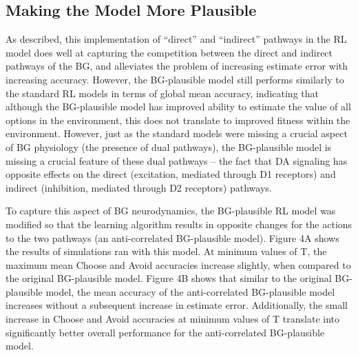 \documentclass[10pt,letterpaper]{article}
\begin{document}
\subsection{Making the Model More Plausible}

As described, this implementation of “direct” and “indirect” pathways in the RL model does well at capturing the competition between the direct and indirect pathways of the BG, and alleviates the problem of increasing estimate error with increasing accuracy. However, the BG-plausible model still performs similarly to the standard RL models in terms of global mean accuracy, indicating that although the BG-plausible model has improved ability to estimate the value of all options in the environment, this does not translate to improved fitness within the environment. However, just as the standard models were missing a crucial aspect of BG physiology (the presence of dual pathways), the BG-plausible model is missing a crucial feature of these dual pathways – the fact that DA signaling has opposite effects on the direct (excitation, mediated through D1 receptors) and indirect (inhibition, mediated through D2 receptors) pathways. 

To capture this aspect of BG neurodynamics, the BG-plausible RL model was modified so that the learning algorithm results in opposite changes for the actions to the two pathways (an anti-correlated BG-plausible model). Figure 4A shows the results of simulations ran with this model. At minimum values of T, the maximum mean Choose and Avoid accuracies increase slightly, when compared to the original BG-plausible model. Figure 4B shows that similar to the original BG-plausible model, the mean accuracy of the anti-correlated BG-plausible model increases without a subsequent increase in estimate error. Additionally, the small increase in Choose and Avoid accuracies at minimum values of T translate into significantly better overall performance for the anti-correlated BG-plausible model. 
\end{document}
